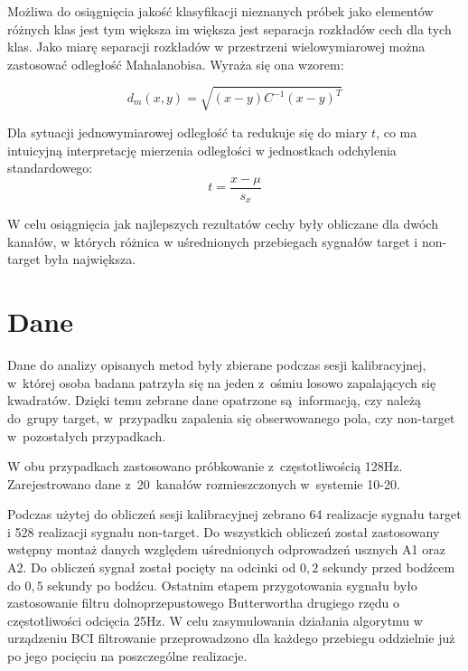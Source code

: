 \documentclass[licencjacka,openright]{pracamgr}
\begin{document}
Możliwa do osiągnięcia jakość klasyfikacji nieznanych próbek jako elementów różnych klas jest tym większa im większa jest separacja rozkładów cech dla tych klas. Jako miarę separacji rozkładów w przestrzeni wielowymiarowej można zastosować odległość Mahalanobisa. Wyraża się ona wzorem:

\begin{equation}
d_{m}{(x,y)}=\sqrt{(x-y)C^{-1}(x-y)^T}
\end{equation}

Dla sytuacji jednowymiarowej odległość ta redukuje się do miary $t$, co ma intuicyjną interpretację mierzenia odległości w jednostkach odchylenia standardowego:
\begin{equation}
t = \frac{x-\mu}{s_x}
\end{equation}

W celu osiągnięcia jak najlepszych rezultatów cechy były obliczane dla dwóch kanałów, w których różnica w uśrednionych przebiegach sygnałów target i non-target była największa.

\chapter{Dane}
Dane do analizy opisanych metod były zbierane podczas sesji kalibracyjnej, w~której osoba badana patrzyła się na jeden z~ośmiu losowo zapalających się kwadratów. Dzięki temu zebrane dane opatrzone są~informacją, czy należą do~grupy target, w~przypadku zapalenia się obserwowanego pola, czy non-target w~pozostałych przypadkach.

W obu przypadkach zastosowano próbkowanie z~częstotliwością 128Hz. Zarejestrowano dane z~20~kanałów rozmieszczonych w~systemie 10-20.

Podczas użytej do obliczeń sesji kalibracyjnej zebrano 64 realizacje sygnału target i 528 realizacji sygnału non-target. Do wszystkich obliczeń został zastosowany wstępny montaż danych względem uśrednionych odprowadzeń usznych A1 oraz A2. Do obliczeń sygnał został pocięty na odcinki od $0{,}2$ sekundy przed bodźcem do $0{,}5$ sekundy po bodźcu. Ostatnim etapem przygotowania sygnału było zastosowanie filtru dolnoprzepustowego Butterwortha drugiego rzędu o częstotliwości odcięcia 25Hz. W celu zasymulowania działania algorytmu w urządzeniu BCI filtrowanie przeprowadzono dla każdego przebiegu oddzielnie już po jego pocięciu na poszczególne realizacje.
\end{document}
